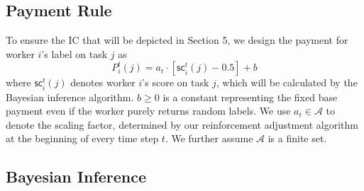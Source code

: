 \subsection{Payment Rule}
\label{payment}
To ensure the IC that will be depicted in Section 5, we design the payment for worker $i$'s label on task $j$ as
\begin{equation}
P^t_i(j)=a_t \cdot [\textsf{sc}^{t}_i(j)-0.5]+b
\label{equation:payment}
\end{equation}
where $\textsf{sc}^{t}_i(j)$ denotes worker $i$'s score on task $j$, which will be calculated by the Bayesian inference algorithm. $b\geq 0$ is a constant representing the fixed base payment even if the worker purely returns random labels. We use $a_t \in \mathcal{A}$ to denote the scaling factor, determined by our reinforcement adjustment algorithm at the beginning of every time step $t$. We further assume $\mathcal{A}$ is a finite set.


\subsection{Bayesian Inference}
\label{inference}


